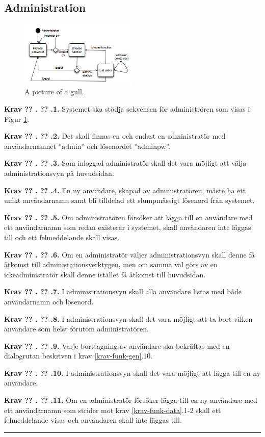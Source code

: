 \documentclass[a4paper]{article}
\newcommand\getcurrentref[1]{%
 \ifnumequal{\value{#1}}{0}
  {??}
  {\the\value{#1}}%
}
\newcommand\requirement[2]{
	\numberedrow{Krav}{#1}{#2}
}
\newcommand\numberedrow[3]{
	\noindent
	\textbf{#1 \getcurrentref{section}.\getcurrentref{subsection}.#2.} #3
	
}
\begin{document}
\subsection{Administration}
\label{krav-funk-admin}

\begin{figure}[h!]
  \centering
    \includegraphics[width=0.5\textwidth]{admin_usage}
   \caption{A picture of a gull.}
   \label{image_admin_usage}
\end{figure}
\requirement{1}{Systemet ska stödja sekvensen för administrören som visas i Figur \ref{image_admin_usage}.}
\requirement{2}{Det skall finnas en och endast en administratör med användarnamnet ''admin'' och lösenordet ''adminpw''.}
\requirement{3}{Som inloggad administratör skall det vara möjligt att välja administrationsvyn på huvudsidan.}
\requirement{4}{En ny användare, skapad av administratören, måste ha ett unikt användarnamn samt bli tilldelad ett slumpmässigt lösenord från systemet.}
\requirement{5}{Om administratören försöker att lägga till en användare med ett användarnamn som redan existerar i systemet, skall användaren inte läggas till och ett felmeddelande skall visas.}
\requirement{6}{Om en administratör väljer administrationsvyn skall denne få åtkomst till administationsverktygen, men om samma val görs av en ickeadministratör skall denne istället få åtkomst till huvudsidan.}
\requirement{7}{I administrationsvyn skall alla användare listas med både användarnamn och lösenord.}
\requirement{8}{I administrationsvyn skall det vara möjligt att ta bort vilken användare som helst förutom administratören.}
\requirement{9}{Varje borttagning av användare ska bekräftas med en dialogrutan beskriven i krav \ref{krav-funk-gen}.10.}
\requirement{10}{I administrationsvyn skall det vara möjligt att lägga till en ny användare.}
\requirement{11}{Om en administratör försöker lägga till en ny användare med ett användarnamn som strider mot krav \ref{krav-funk-data}.1-2 skall ett felmeddelande visas och användaren skall inte läggas till.}

\noindent\rule{8cm}{0.4pt} %
\end{document}
